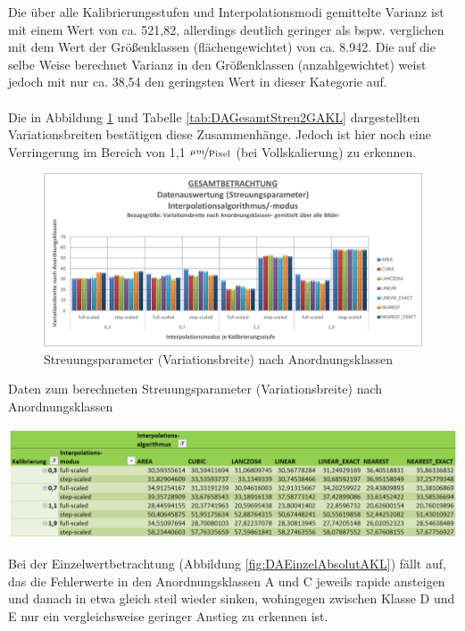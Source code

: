 \documentclass[
fontsize=10pt, 
listof = totoc,
parskip = half	
]{report}
\begin{document}
\noindent Die über alle Kalibrierungsstufen und Interpolationsmodi gemittelte Varianz ist mit einem Wert von ca. 521,82, allerdings deutlich geringer als bspw. verglichen mit dem Wert der Größenklassen (flächengewichtet) von ca. 8.942. Die auf die selbe Weise berechnet Varianz in den Größenklassen (anzahlgewichtet) weist jedoch mit nur ca. 38,54 den geringsten Wert in dieser Kategorie auf. 
\\\\
\noindent Die in Abbildung \ref{fig:DAGesamtStreu2AKL} und Tabelle \ref{tab:DAGesamtStreu2GAKL} dargestellten Variationsbreiten bestätigen diese Zusammenhänge. Jedoch ist hier noch eine Verringerung im Bereich von 1,1 $\nicefrac{\mu m}{\text{Pixel}}$ (bei Vollskalierung) zu erkennen.

\begin{figure}[H]
	\centering
	\includegraphics[width=\textwidth, height=\textheight, keepaspectratio]{pics/DA_Gesamt_Streu2_AKL}
	\caption{Streuungsparameter (Variationsbreite) nach Anordnungsklassen}
	\label{fig:DAGesamtStreu2AKL}
\end{figure}

\begin{table}[H]
	\caption{Daten zum berechneten Streuungsparameter (Variationsbreite) nach Anordnungsklassen}
	\centering
	\includegraphics[width=\textwidth, height=\textheight, keepaspectratio]{pics/Tab_DA_Gesamt_Streu2_AKL}
	\label{tab:DAGesamtStreu2GAKL}
\end{table}

\noindent Bei der Einzelwertbetrachtung (Abbildung \ref{fig:DAEinzelAbsolutAKL}) fällt auf, das die Fehlerwerte in den Anordnungsklassen A und C jeweils rapide ansteigen und danach in etwa gleich steil wieder sinken, wohingegen zwischen Klasse D und E nur ein vergleichsweise geringer Anstieg zu erkennen ist.
\end{document}
